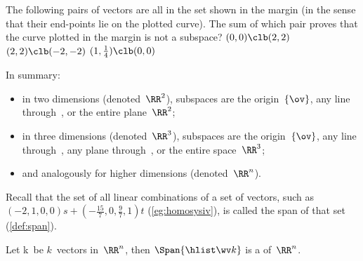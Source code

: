 \begin{activity}
The following pairs of vectors are all in the set shown in the margin (in the sense that their end-points lie on the plotted curve).  
%
The sum of which pair proves that the curve plotted in the margin is not a subspace?
{\((0,0)\clb (2,2)\)}
{\((2,2)\clb (-2,-2)\)}
{\((1,\frac14)\clb (0,0)\)}
\end{activity}




In summary:
\begin{itemize}
\item in two dimensions (denoted~\(\RR^2\)), subspaces are the origin~\(\{\ov\}\), any line through~\ov, or the entire plane~\(\RR^2\);
\item in three dimensions (denoted~\(\RR^3\)), subspaces are the origin~\(\{\ov\}\), any line through~\ov, any plane through~\ov, or the entire space~\(\RR^3\);
\item and analogously for higher dimensions (denoted~\(\RR^n\)).
\end{itemize}


Recall that the set of all linear combinations of a set of vectors, such as \((-2,1,0,0)s+(-\frac{15}7,0,\frac97,1)t\) (\cref{eg:homosysiv}), is called the span of that set (\cref{def:span}).

\begin{theorem} \label{thm:spansubs} 
Let \hlist\wv k\ be \(k\)~vectors in~\(\RR^n\),
then \(\Span\{\hlist\wv k\}\) is a  of~\(\RR^n\).
\end{theorem}

